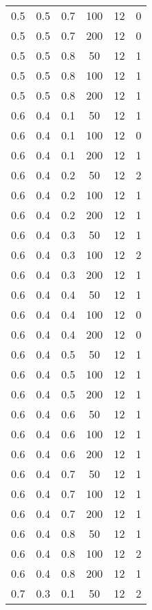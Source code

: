 \begin{center}
\begin{longtable}[c]{|c|c|c|c|c|c|}
	0.5 &  0.5 &  0.7 &  100 &    12 &     0 \\
	0.5 &  0.5 &  0.7 &  200 &    12 &     0 \\
   \hline
	0.5 &  0.5 &  0.8 &   50 &    12 &     1 \\
	0.5 &  0.5 &  0.8 &  100 &    12 &     1 \\
	0.5 &  0.5 &  0.8 &  200 &    12 &     1 \\
   \hline
	0.6 &  0.4 &  0.1 &   50 &    12 &     1 \\
	0.6 &  0.4 &  0.1 &  100 &    12 &     0 \\
	0.6 &  0.4 &  0.1 &  200 &    12 &     1 \\
   \hline
	0.6 &  0.4 &  0.2 &   50 &    12 &     2 \\
	0.6 &  0.4 &  0.2 &  100 &    12 &     1 \\
	0.6 &  0.4 &  0.2 &  200 &    12 &     1 \\
   \hline
	0.6 &  0.4 &  0.3 &   50 &    12 &     1 \\
	0.6 &  0.4 &  0.3 &  100 &    12 &     2 \\
	0.6 &  0.4 &  0.3 &  200 &    12 &     1 \\
   \hline
	0.6 &  0.4 &  0.4 &   50 &    12 &     1 \\
	0.6 &  0.4 &  0.4 &  100 &    12 &     0 \\
	0.6 &  0.4 &  0.4 &  200 &    12 &     0 \\
   \hline
	0.6 &  0.4 &  0.5 &   50 &    12 &     1 \\
	0.6 &  0.4 &  0.5 &  100 &    12 &     1 \\
	0.6 &  0.4 &  0.5 &  200 &    12 &     1 \\
   \hline
	0.6 &  0.4 &  0.6 &   50 &    12 &     1 \\
	0.6 &  0.4 &  0.6 &  100 &    12 &     1 \\
	0.6 &  0.4 &  0.6 &  200 &    12 &     1 \\
   \hline
	0.6 &  0.4 &  0.7 &   50 &    12 &     1 \\
	0.6 &  0.4 &  0.7 &  100 &    12 &     1 \\
	0.6 &  0.4 &  0.7 &  200 &    12 &     1 \\
   \hline
	0.6 &  0.4 &  0.8 &   50 &    12 &     1 \\
	0.6 &  0.4 &  0.8 &  100 &    12 &     2 \\
	0.6 &  0.4 &  0.8 &  200 &    12 &     1 \\
   \hline
	0.7 &  0.3 &  0.1 &   50 &    12 &     2 \\

\end{longtable}
\end{center}
